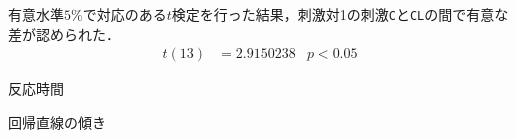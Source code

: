 有意水準\(5\%\)で対応のある\(t\)検定を行った結果，刺激対1の刺激\texttt{C}と\texttt{CL}の間で有意な差が認められた．
\begin{align}
    t(13) & =2.9150238 & p<0.05
\end{align}
\begin{table}[H]
    \centering
    \caption{反応時間}
    \label{tbl:反応時間}
    \fontsize{4}{3}\selectfont\ttfamily
    
\end{table}
\begin{table}[H]
    \centering
    \caption{回帰直線の傾き}
    \label{tbl:回帰直線の傾き}
    \fontsize{4}{1}\selectfont\ttfamily
    
\end{table}
